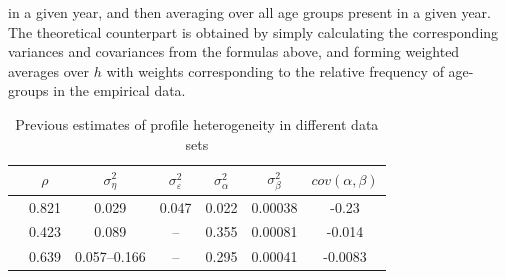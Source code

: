 in a given year, and then averaging over all age groups present in a given year.
The theoretical counterpart is obtained by simply calculating the corresponding
variances and covariances from the formulas above, and forming weighted averages
over $h$ with weights corresponding to the relative frequency of age-groups in
the empirical data.
\begin{table}
\begin{tabular}{l|c|c|c|c|c|c}
\hline
                        & $\rho$ & $\sigma^2_{\eta}$ & $\sigma^2_{\varepsilon}$ & $\sigma^2_{\alpha}$ & $\sigma^2_{\beta}$ & $cov(\alpha,\beta)$ \\
                        \hline
\citet{Guvenen2009}     & 0.821  &   0.029           &    0.047                 &     0.022           &       0.00038      &      -0.23           \\
\citet{Baker1997}       & 0.423  &   0.089           &     --                   &     0.355           &       0.00081      &      -0.014          \\
\citet{Haider2001}      & 0.639  & 0.057--0.166      &     --                   &     0.295           &       0.00041      &      -0.0083 \\
\hline
\end{tabular}
\caption{Previous estimates of profile heterogeneity in different data sets}
\label{tab:hip_literature}
\end{table}

